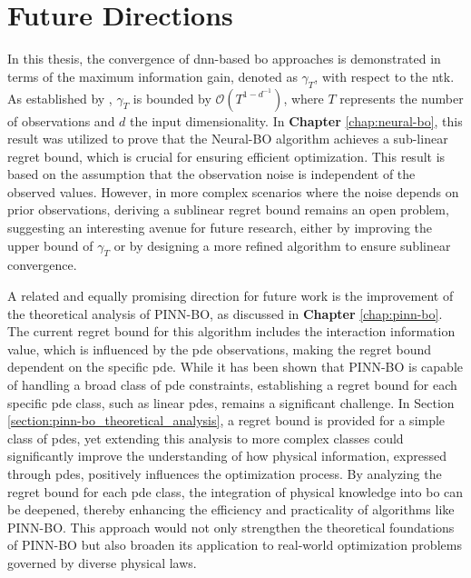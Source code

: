 \section{Future Directions}
In this thesis, the convergence of \ac{dnn}-based \ac{bo} approaches is demonstrated in terms of the maximum information gain, denoted as $\gamma_T$, with respect to the \ac{ntk}. As established by \citet{kassraie2022neural}, $\gamma_T$ is bounded by $\mathcal{O}(T^{1-d^{-1}})$, where $T$ represents the number of observations and $d$ the input dimensionality. In \textbf{Chapter} \ref{chap:neural-bo}, this result was utilized to prove that the Neural-BO algorithm achieves a sub-linear regret bound, which is crucial for ensuring efficient optimization. This result is based on the assumption that the observation noise is independent of the observed values. However, in more complex scenarios where the noise depends on prior observations, deriving a sublinear regret bound remains an open problem, suggesting an interesting avenue for future research, either by improving the upper bound of $\gamma_T$ or by designing a more refined algorithm to ensure sublinear convergence.

A related and equally promising direction for future work is the improvement of the theoretical analysis of PINN-BO, as discussed in \textbf{Chapter} \ref{chap:pinn-bo}. The current regret bound for this algorithm includes the interaction information value, which is influenced by the \ac{pde} observations, making the regret bound dependent on the specific \ac{pde}. While it has been shown that PINN-BO is capable of handling a broad class of \ac{pde} constraints, establishing a regret bound for each specific \ac{pde} class, such as linear \acp{pde}, remains a significant challenge. In Section \ref{section:pinn-bo_theoretical_analysis}, a regret bound is provided for a simple class of \acp{pde}, yet extending this analysis to more complex classes could significantly improve the understanding of how physical information, expressed through \acp{pde}, positively influences the optimization process. By analyzing the regret bound for each \ac{pde} class, the integration of physical knowledge into \acl{bo} can be deepened, thereby enhancing the efficiency and practicality of algorithms like PINN-BO. This approach would not only strengthen the theoretical foundations of PINN-BO but also broaden its application to real-world optimization problems governed by diverse physical laws.      
